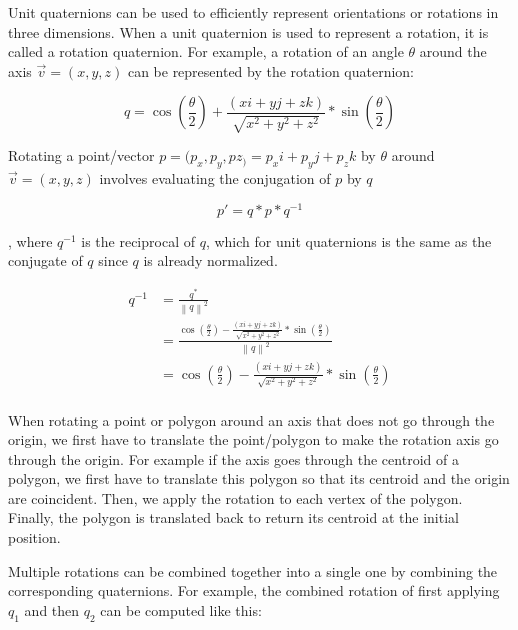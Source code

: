 Unit quaternions can be used to efficiently represent orientations or rotations in three dimensions. When a unit quaternion is used to represent a rotation, it is called a rotation quaternion. For example, a rotation of an angle \( \theta \) around the axis \( \vec{v} = (x, y, z) \) can be represented by the rotation quaternion:

\begin{equation}
    q = \cos(\frac{\theta}{2}) + \frac{(xi + yj + zk)}{\sqrt{x^2 + y^2 + z^2}}*\sin(\frac{\theta}{2})
\end{equation}

Rotating a point/vector \( p = (p_x, p_y, pz_) = p_xi + p_yj + p_zk \) by \( \theta \) around \( \vec{v} = (x, y, z) \) involves evaluating the conjugation of \( p \) by \( q \) 

\begin{equation}
    p' = q*p*q^{-1}
\end{equation}

, where \( q^{-1} \) is the reciprocal of \( q \), which for unit quaternions is the same as the conjugate of \( q \) since \( q \) is already normalized.

\begin{equation}
\begin{split}
    q^{-1} & = \frac{q^{\ast}}{{\left \| q \right \|}^2} \\
            & = \frac{\cos(\frac{\theta}{2}) - \frac{(xi + yj + zk)}{\sqrt{x^2 + y^2 + z^2}}*\sin(\frac{\theta}{2})}{{\left \| q \right \|}^2} \\
            & = \cos(\frac{\theta}{2}) - \frac{(xi + yj + zk)}{\sqrt{x^2 + y^2 + z^2}}*\sin(\frac{\theta}{2}) \\
\end{split}
\end{equation}

When rotating a point or polygon around an axis that does not go through the origin, we first have to translate the point/polygon to make the rotation axis go through the origin. For example if the axis goes through the centroid of a polygon, we first have to translate this polygon so that its centroid and the origin are coincident. Then, we apply the rotation to each vertex of the polygon. Finally, the polygon is translated back to return its centroid at the initial position.

Multiple rotations can be combined together into a single one by combining the corresponding quaternions. For example, the combined rotation of first applying \( q_1 \) and then \( q_2 \) can be computed like this:


